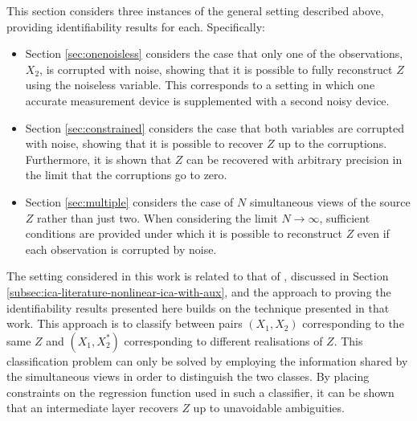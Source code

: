 This section considers three instances of the general setting described above, providing identifiability results for each.
Specifically:
%
\begin{itemize}
	\item Section \ref{sec:onenoisless} considers the case that only one of the observations, $X_2$, is corrupted with noise, showing that it is possible to fully reconstruct $Z$ using the noiseless variable. 
	This corresponds to a setting in which one accurate measurement device is supplemented with a second noisy device. 
	\item Section \ref{sec:constrained} considers the case that both variables are corrupted with noise, showing that it is possible to recover $Z$ up to the corruptions. 
	Furthermore, it is shown that $Z$ can be recovered with arbitrary precision in the limit that the corruptions go to zero.
	\item Section \ref{sec:multiple} considers the case of $N$ simultaneous views of the source $Z$ rather than just two.
	When considering the limit $N \rightarrow \infty$, sufficient conditions are provided under which it is possible to reconstruct $Z$ even if each observation is corrupted by noise.
\end{itemize}
%



The setting considered in this work is related to that of \cite{hyvarinen19a}, discussed in Section \ref{subsec:ica-literature-nonlinear-ica-with-aux},
and the approach to proving the identifiability results presented here builds on the technique presented in that work.
This approach 
is to classify between pairs $(X_1, X_2)$ corresponding to the same $Z$ and $(X_1, X^*_2)$ corresponding to different realisations of $Z$.
This classification problem can only be solved by employing the information shared by the simultaneous views in order to distinguish the two classes.
By placing constraints on the regression function used in such a classifier, it can be shown that an intermediate layer recovers $Z$ up to unavoidable ambiguities.

